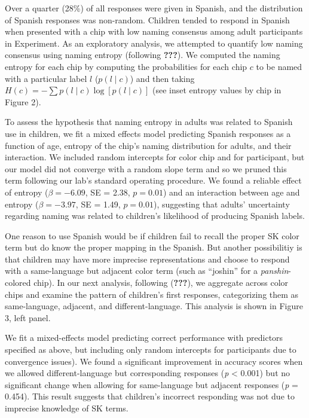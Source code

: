 \documentclass[floatsintext,man]{apa6}
\theoremstyle{definition}
\theoremstyle{definition}
\theoremstyle{definition}
\theoremstyle{remark}
\begin{document}
Over a quarter (28\%) of all responses were given in Spanish, and the
distribution of Spanish responses was non-random. Children tended to
respond in Spanish when presented with a chip with low naming consensus
among adult participants in Experiment. As an exploratory analysis, we
attempted to quantify low naming consensus using naming entropy
(following {\textbf{???}}). We computed the naming entropy for each chip
by computing the probabilities for each chip \(c\) to be named with a
particular label \(l\) (\(p(l \mid c)\)) and then taking
\(H(c) = - \sum{p(l\mid c) \log[p(l \mid c)]}\) (see inset entropy
values by chip in Figure 2).

To assess the hypothesis that naming entropy in adults was related to
Spanish use in children, we fit a mixed effects model predicting Spanish
responses as a function of age, entropy of the chip's naming
distribution for adults, and their interaction. We included random
intercepts for color chip and for participant, but our model did not
converge with a random slope term and so we pruned this term following
our lab's standard operating procedure. We found a reliable effect of
entropy (\(\beta = -6.09\), SE = 2.38, \(p = 0.01\)) and an interaction
between age and entropy (\(\beta = -3.97\), SE = 1.49, \(p = 0.01\)),
suggesting that adults' uncertainty regarding naming was related to
children's likelihood of producing Spanish labels.

One reason to use Spanish would be if children fail to recall the proper
SK color term but do know the proper mapping in the Spanish. But another
possibilitiy is that children may have more imprecise representations
and choose to respond with a same-language but adjacent color term (such
as \enquote{joshin} for a \emph{panshin}-colored chip). In our next
analysis, following ({\textbf{???}}), we aggregate across color chips
and examine the pattern of children's first responses, categorizing them
as same-language, adjacent, and different-language. This analysis is
shown in Figure 3, left panel.

We fit a mixed-effects model predicting correct performance with
predictors specified as above, but including only random intercepts for
participants due to convergence issues). We found a significant
improvement in accuracy scores when we allowed different-language but
corresponding responses (\emph{p} \textless{} 0.001) but no significant
change when allowing for same-language but adjacent responses (\emph{p}
= 0.454). This result suggests that children's incorrect responding was
not due to imprecise knowledge of SK terms.
\end{document}
